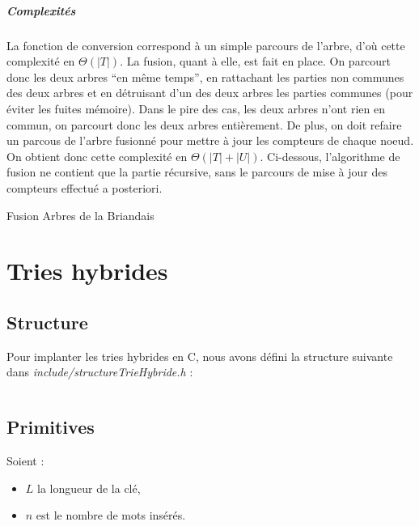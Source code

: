 \documentclass[11pt]{report} %
\begin{document}
\paragraph{Complexités} La fonction de conversion correspond à un simple parcours de l'arbre, d'où cette complexité en $\Theta(|T|)$. La fusion, quant à elle, est fait en place. On parcourt donc les deux arbres ``en même temps'', en rattachant les parties non communes des deux arbres et en détruisant d'un des deux arbres les parties communes (pour éviter les fuites mémoire). Dans le pire des cas, les deux arbres n'ont rien en commun, on parcourt donc les deux arbres entièrement. De plus, on doit refaire un parcous de l'arbre fusionné pour mettre à jour les compteurs de chaque noeud. On obtient donc cette complexité en $\Theta(|T|+|U|)$. Ci-dessous, l'algorithme de fusion ne contient que la partie récursive, sans le parcours de mise à jour des compteurs effectué a posteriori.

\begin{algorithm}
  \caption{Fusion Arbres de la Briandais}
  \begin{algorithmic}[1]
    \EndIf
    \Else
    \EndIf
    \EndFunction
  \end{algorithmic}
\end{algorithm}

\chapter{Tries hybrides}

\section{Structure}

Pour implanter les tries hybrides en C, nous avons défini la structure suivante dans \textit{include/structureTrieHybride.h} :
\inputminted[firstline=4, lastline=10]{c}{../include/structureTrieHybride.h}

\section{Primitives}
Soient :
\begin{itemize}
\item $L$ la longueur de la clé,
\item $n$ est le nombre de mots insérés.
\end{itemize}
\end{document}
